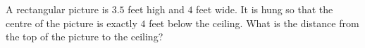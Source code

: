A rectangular picture is $3.5$ feet high and $4$ feet wide. It is hung so that the centre of the picture is exactly $4$ feet below the ceiling. What is the distance from the top of the picture to the ceiling?
